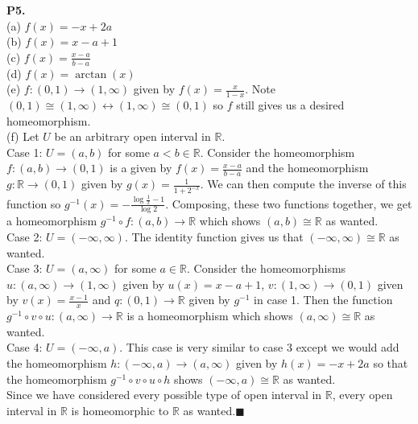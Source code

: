 \documentclass{article}
\begin{document}
    \textbf{P5.}\\
    (a) $f(x) = -x + 2a$\\
    (b) $f(x) = x - a + 1$\\
    (c) $f(x) = \frac{x-a}{b-a}$\\
    (d) $f(x) = \arctan(x)$\\
    (e) $f: (0,1) \to (1,\infty)$ given by $f(x) = \frac{x}{1-x}$. Note $(0,1)\cong(1,\infty) \leftrightarrow (1,\infty)\cong(0,1)$
    so $f$ still gives us a desired homeomorphism.\\
    (f) Let $U$ be an arbitrary open interval in $\mathbb{R}$.\\
    \newpage
    Case 1: $U = (a,b)$ for some $a<b\in\mathbb{R}$. Consider the homeomorphism $f:(a,b)\to (0,1)$ is a given by 
    $f(x) = \frac{x-a}{b-a}$ and the homeomorphism $g: \mathbb{R} \to (0,1)$ given by $g(x) = \frac{1}{1+2^{-x}}$.
    We can then compute the inverse of this function so $g^{-1}(x) = -\frac{\log{\frac{1}{x}-1}}{\log{2}}$. Composing,
    these two functions together, we get a homeomorphism $g^{-1}\circ f: (a,b) \to \mathbb{R}$ which shows $(a,b)\cong\mathbb{R}$
    as wanted.\\
    Case 2: $U = (-\infty,\infty)$. The identity function gives us that $(-\infty,\infty)\cong\mathbb{R}$ as wanted.\\
    Case 3: $U = (a,\infty)$ for some $a\in\mathbb{R}$. Consider the homeomorphisms $u: (a,\infty)\to(1,\infty)$ given by
    $u(x) = x - a + 1$, $v: (1,\infty)\to(0,1)$ given by $v(x) = \frac{x-1}{x}$ and $q: (0,1)\to\mathbb{R}$ given by $g^{-1}$
    in case 1. Then the function $g^{-1}\circ v\circ u: (a,\infty) \to \mathbb{R}$ is a homeomorphism which shows $(a,\infty)
    \cong\mathbb{R}$ as wanted.\\
    Case 4: $U = (-\infty,a)$. This case is very similar to case 3 except we would add the homeomorphism $h:(-\infty,a)\to(a,\infty)$
    given by $h(x) = -x + 2a$ so that the homeomorphism $g^{-1}\circ v\circ u\circ h$ shows $(-\infty,a)\cong\mathbb{R}$ as wanted.\\
    Since we have considered every possible type of open interval in $\mathbb{R}$, every open interval in $\mathbb{R}$ is
    homeomorphic to $\mathbb{R}$ as wanted.\hfill$\blacksquare$\\
\end{document}
